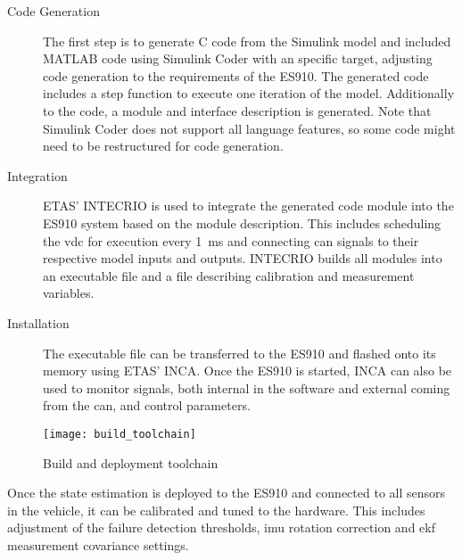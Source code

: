 \begin{description}
\item[Code Generation] The first step is to generate C code from the Simulink model and included MATLAB code using Simulink Coder with an specific target, adjusting code generation to the requirements of the ES910. The generated code includes a step function to execute one iteration of the model. Additionally to the code, a module and interface description is generated. Note that Simulink Coder does not support all language features, so some code might need to be restructured for code generation.

\item[Integration] ETAS' INTECRIO is used to integrate the generated code module into the ES910 system based on the module description. This includes scheduling the \gls{vdc} for execution every \SI{1}{\milli\second} and connecting \gls{can} signals to their respective model inputs and outputs. INTECRIO builds all modules into an executable file and a file describing calibration and measurement variables.

\item[Installation] The executable file can be transferred to the ES910 and flashed onto its memory using ETAS' INCA. Once the ES910 is started, INCA can also be used to monitor signals, both internal in the software and external coming from the \gls{can}, and control parameters.
\end{description}

\begin{figure}
	\centering
	\texttt{[image: build\_toolchain]}%
	\caption{Build and deployment toolchain}
	\label{fig:build-toolchain}
\end{figure}

Once the state estimation is deployed to the ES910 and connected to all sensors in the vehicle, it can be calibrated and tuned to the hardware. This includes adjustment of the failure detection thresholds, \gls{imu} rotation correction and \gls{ekf} measurement covariance settings.

